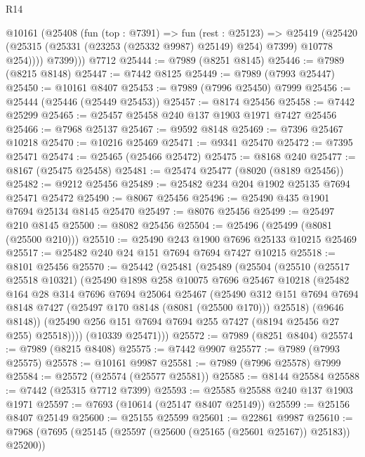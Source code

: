 \begin{lexlean}{R14}
\begin{coremodule}
        @10161
          (@25408
            (fun (top : @7391) =>
            fun (rest : @25123) =>
            @25419
              (@25420 (@25315 (@25331 (@23253 (@25332 @9987) @25149) @254) @7399) @10778 @254))))
          @7399)))
    @7712
@25444 := @7989 (@8251 @8145)
@25446 := @7989 (@8215 @8148)
@25447 := @7442 @8125
@25449 := @7989 (@7993 @25447)
@25450 := @10161 @8407
@25453 := @7989 (@7996 @25450) @7999
@25456 := @25444 (@25446 (@25449 @25453))
@25457 := @8174 @25456
@25458 := @7442 @25299
@25465 := @25457 @25458 @240 @137 @1903 @1971 @7427 @25456
@25466 := @7968 @25137
@25467 := @9592 @8148
@25469 := @7396 @25467 @10218
@25470 := @10216 @25469
@25471 := @9341 @25470
@25472 := @7395 @25471
@25474 := @25465 (@25466 @25472)
@25475 := @8168 @240
@25477 := @8167 (@25475 @25458)
@25481 := @25474 @25477 (@8020 (@8189 @25456))
@25482 := @9212 @25456
@25489 := @25482 @234 @204 @1902 @25135 @7694 @25471 @25472
@25490 := @8067 @25456
@25496 := @25490 @435 @1901 @7694 @25134 @8145 @25470
@25497 := @8076 @25456
@25499 := @25497 @210 @8145
@25500 := @8082 @25456
@25504 := @25496 (@25499 (@8081 (@25500 @210)))
@25510 := @25490 @243 @1900 @7696 @25133 @10215 @25469
@25517 := @25482 @240 @24 @151 @7694 @7694 @7427 @10215
@25518 := @8101 @25456
@25570 := @25442
    (@25481
      (@25489
        (@25504
          (@25510
            (@25517 @25518 @10321)
            (@25490
              @1898
              @258
              @10075
              @7696
              @25467
              @10218
              (@25482
                @164
                @28
                @314
                @7696
                @7694
                @25064
                @25467
                (@25490
                  @312
                  @151
                  @7694
                  @7694
                  @8148
                  @7427
                  (@25497 @170 @8148 (@8081 (@25500 @170)))
                  @25518)
                (@9646 @8148))
              (@25490 @256 @151 @7694 @7694 @255 @7427 (@8194 @25456 @27 @255) @25518))))
        (@10339 @25471)))
@25572 := @7989 (@8251 @8404)
@25574 := @7989 (@8215 @8408)
@25575 := @7442 @9907
@25577 := @7989 (@7993 @25575)
@25578 := @10161 @9987
@25581 := @7989 (@7996 @25578) @7999
@25584 := @25572 (@25574 (@25577 @25581))
@25585 := @8144 @25584
@25588 := @7442 (@25315 @7712 @7399)
@25593 := @25585 @25588 @240 @137 @1903 @1971
@25597 := @7693 (@10614 (@25147 @8407 @25149))
@25599 := @25156 @8407 @25149
@25600 := @25155 @25599
@25601 := @22861 @9987
@25610 := @7968 (@7695 (@25145 (@25597 (@25600 (@25165 (@25601 @25167)) @25183)) @25200))

\end{coremodule}
\end{lexlean}
